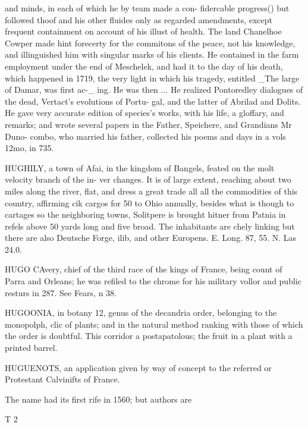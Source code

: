 and minds, in each of which he by team made a con-
fidercable progress() but followed thoof and his other
fluides only as regarded amendments, except frequent
containment on account of his illust of health. The
land Chanelhoe Cowper made hint forecerty for the
commitons of the peace, not his knowledge, and
illinguished him with singular marks of his clients.
He contained in the farm employment under the end
of Meschelek, and had it to the day of his death,
which happened in 1719, the very light in which his
tragedy, entitled \_The large of Damar, was first ac-\_
ing. He was then ... He realized Pontoredley
dialogues of the dead, Vertact's evolutions of Portu-
gal, and the latter of Abrilad and Dolits. He gave
very accurate edition of species's works, with his
life, a gloffary, and remarks; and wrote several papers
in the Father, Speichere, and Grandians Mr Duno-
combo, who married his father, collected his poems
and days in a vols 12mo, in 735.\par\medskip
HUGHILY, a town of Afai, in the kingdom of
Bangels, feated on the molt velocity branch of the in-
ver changes. It is of large extent, reaching about
two miles along the river, flat, and dress a great trade
all all the commodities of this country, affirming cik
cargos for 50 to Ohio annually, besides what is
though to cartages so the neighboring towns,
Solitpere is brought hitner from Patnia in refels above
50 yards long and five broad. The inhabitants are
chely linking but there are also Deutsche Forge,
ilib, and other Europens. E. Long. 87, 55. N.
Las 24.0.\par\medskip
HUGO CAvery, chief of the third race of the kings
of France, being count of Parra and Orleans; he was
refiled to the chrome for his military vollor and public
resturs in 287. See Fears, n 38.\par\medskip
HUGOONIA, in botany 12, genus of the decandria
order, belonging to the monopolph, clic of plants;
and in the natural method ranking with those of which
the order is doubtful. This corridor a postapatolous;
the fruit in a plant with a printed barrel.\par\medskip
HUGUENOTS, an application given by way of
concept to the referred or Protestant Calvinifts of
France.\par\medskip
The name had its first rife in 1560; but authors are\par{} T 2\par\medskip
